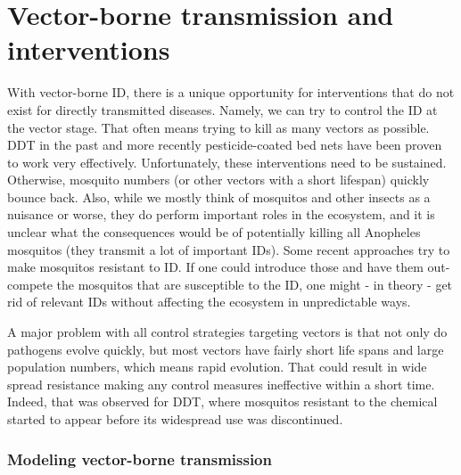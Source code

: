 \documentclass[]{book}
\theoremstyle{definition}
\theoremstyle{definition}
\theoremstyle{definition}
\theoremstyle{remark}
\begin{document}
\section{Vector-borne transmission and
interventions}\label{vector-borne-transmission-and-interventions}

With vector-borne ID, there is a unique opportunity for interventions
that do not exist for directly transmitted diseases. Namely, we can try
to control the ID at the vector stage. That often means trying to kill
as many vectors as possible. DDT in the past and more recently
pesticide-coated bed nets have been proven to work very effectively.
Unfortunately, these interventions need to be sustained. Otherwise,
mosquito numbers (or other vectors with a short lifespan) quickly bounce
back. Also, while we mostly think of mosquitos and other insects as a
nuisance or worse, they do perform important roles in the ecosystem, and
it is unclear what the consequences would be of potentially killing all
Anopheles mosquitos (they transmit a lot of important IDs). Some recent
approaches try to make mosquitos resistant to ID. If one could introduce
those and have them out-compete the mosquitos that are susceptible to
the ID, one might - in theory - get rid of relevant IDs without
affecting the ecosystem in unpredictable ways.

A major problem with all control strategies targeting vectors is that
not only do pathogens evolve quickly, but most vectors have fairly short
life spans and large population numbers, which means rapid evolution.
That could result in wide spread resistance making any control measures
ineffective within a short time. Indeed, that was observed for DDT,
where mosquitos resistant to the chemical started to appear before its
widespread use was discontinued.

\subsubsection{Modeling vector-borne transmission}\label{myadvancedbox}
\end{document}
